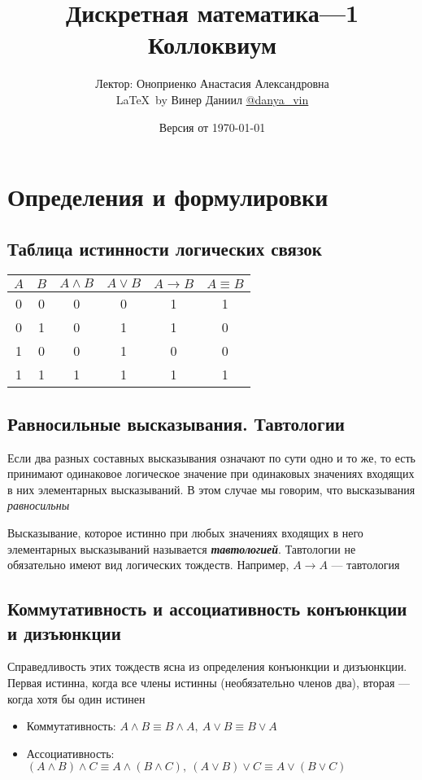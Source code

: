 \documentclass[a4paper]{article}
\begin{document}
\title{\LARGE{Дискретная математика—1}\\ Коллоквиум}
\author{Лектор: Оноприенко Анастасия Александровна\\\LaTeX\ by Винер Даниил \href{https://t.me/danya_vin}{@danya\_vin}}
\date{Версия от \today}
\maketitle

\tableofcontents
\newpage
\setlength{\parindent}{15pt}
\setlength{\parskip}{2mm}
\section{Определения и формулировки}
\subsection{Таблица истинности логических связок}

\begin{tabular}{|c|c|c|c|c|c|}
\hline
$A$ & $B$ & $A\wedge B$ & $A\vee B$ & $A\rightarrow B$ & $A\equiv B$ \\
\hline
0 & 0 & 0 & 0 & 1 & 1 \\
\hline
0 & 1 & 0 & 1 & 1 & 0 \\
\hline
1 & 0 & 0 & 1 & 0 & 0 \\
\hline
1 & 1 & 1 & 1 & 1 & 1 \\
\hline
\end{tabular}


\subsection{Равносильные высказывания. Тавтологии}
 Если два разных составных высказывания означают по сути одно и то же, то есть принимают одинаковое логическое значение при одинаковых значениях входящих в них элементарных высказываний. В этом случае мы говорим, что высказывания \textit{равносильны}

 Высказывание, которое истинно при любых значениях входящих в него элементарных высказываний называется \textit{\textbf{тавтологией}}. Тавтологии не обязательно имеют вид логических тождеств. Например, $A\rightarrow A$ — тавтология


\subsection{Коммутативность и ассоциативность конъюнкции и дизъюнкции}
Справедливость этих тождеств ясна из определения конъюнкции и дизъюнкции. Первая истинна, когда все члены истинны (необязательно членов два), вторая — когда хотя бы один истинен
\begin{itemize}
    \item Коммутативность: $A\wedge B\equiv B\wedge A,\ A\vee B\equiv B\vee A$
    \item Ассоциативность: $(A\wedge B)\wedge C\equiv A\wedge (B\wedge C),\ (A\vee B)\vee C\equiv A\vee (B\vee C)$
\end{itemize}
\end{document}
